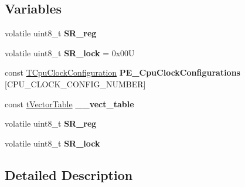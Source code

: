 \subsection*{Variables}
\begin{DoxyCompactItemize}
\item 
\hypertarget{group___cpu__module_ga326c16dd0db38f80ec48c7727d764481}{}volatile uint8\+\_\+t {\bfseries S\+R\+\_\+reg}\label{group___cpu__module_ga326c16dd0db38f80ec48c7727d764481}

\item 
\hypertarget{group___cpu__module_ga08ee8b0f642aeef5bbbce3bb4ec1bb28}{}volatile uint8\+\_\+t {\bfseries S\+R\+\_\+lock} = 0x00\+U\label{group___cpu__module_ga08ee8b0f642aeef5bbbce3bb4ec1bb28}

\item 
\hypertarget{group___cpu__module_gab69281f0e90d16198a5595ed7f471441}{}const \hyperlink{struct_t_cpu_clock_configuration}{T\+Cpu\+Clock\+Configuration} {\bfseries P\+E\+\_\+\+Cpu\+Clock\+Configurations} \mbox{[}C\+P\+U\+\_\+\+C\+L\+O\+C\+K\+\_\+\+C\+O\+N\+F\+I\+G\+\_\+\+N\+U\+M\+B\+E\+R\mbox{]}\label{group___cpu__module_gab69281f0e90d16198a5595ed7f471441}

\item 
\hypertarget{group___cpu__module_ga17baaa5ab2c8895394c51a01248c5195}{}const \hyperlink{structt_vector_table}{t\+Vector\+Table} {\bfseries \+\_\+\+\_\+vect\+\_\+table}\label{group___cpu__module_ga17baaa5ab2c8895394c51a01248c5195}

\item 
\hypertarget{group___cpu__module_ga326c16dd0db38f80ec48c7727d764481}{}volatile uint8\+\_\+t {\bfseries S\+R\+\_\+reg}\label{group___cpu__module_ga326c16dd0db38f80ec48c7727d764481}

\item 
\hypertarget{group___cpu__module_ga08ee8b0f642aeef5bbbce3bb4ec1bb28}{}volatile uint8\+\_\+t {\bfseries S\+R\+\_\+lock}\label{group___cpu__module_ga08ee8b0f642aeef5bbbce3bb4ec1bb28}

\end{DoxyCompactItemize}


\subsection{Detailed Description}
